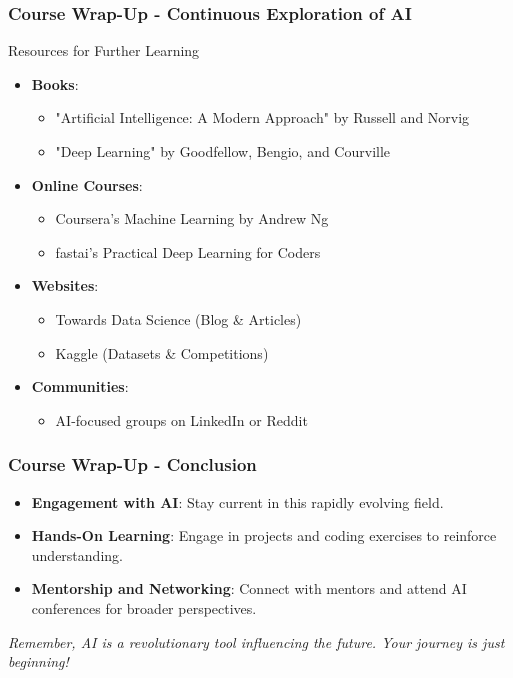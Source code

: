\documentclass[aspectratio=169]{beamer}
\begin{document}
\begin{frame}[fragile]
    \frametitle{Course Wrap-Up - Continuous Exploration of AI}
    \begin{block}{Resources for Further Learning}
        \begin{itemize}
            \item \textbf{Books}:
                \begin{itemize}
                    \item "Artificial Intelligence: A Modern Approach" by Russell and Norvig
                    \item "Deep Learning" by Goodfellow, Bengio, and Courville
                \end{itemize}
            \item \textbf{Online Courses}:
                \begin{itemize}
                    \item Coursera's Machine Learning by Andrew Ng
                    \item fastai's Practical Deep Learning for Coders
                \end{itemize}
            \item \textbf{Websites}:
                \begin{itemize}
                    \item Towards Data Science (Blog & Articles)
                    \item Kaggle (Datasets & Competitions)
                \end{itemize}
            \item \textbf{Communities}: 
                \begin{itemize}
                    \item AI-focused groups on LinkedIn or Reddit
                \end{itemize}
        \end{itemize}
    \end{block}
\end{frame}

\begin{frame}[fragile]
    \frametitle{Course Wrap-Up - Conclusion}
    \begin{itemize}
        \item \textbf{Engagement with AI}: Stay current in this rapidly evolving field.
        \item \textbf{Hands-On Learning}: Engage in projects and coding exercises to reinforce understanding.
        \item \textbf{Mentorship and Networking}: Connect with mentors and attend AI conferences for broader perspectives.
    \end{itemize}
    \vspace{1cm}
    \textit{Remember, AI is a revolutionary tool influencing the future. Your journey is just beginning!}
\end{frame}
\end{document}
